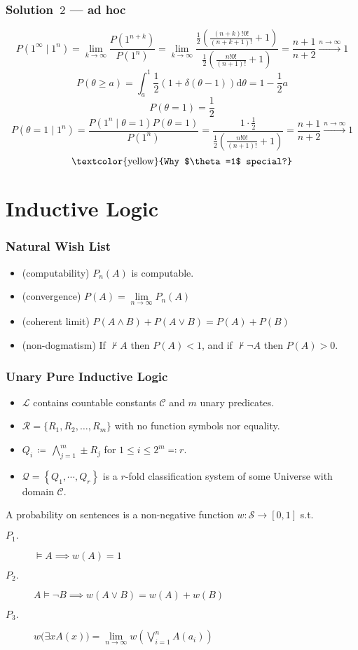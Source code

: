 \documentclass[UTF8,11pt,colorlinks,compress,openany]{beamer}%
\begin{document}
\begin{frame}\frametitle{Solution~$2$ --- ad hoc}
	\[P(1^\infty\mid 1^n)=\lim\limits_{k\to\infty}\dfrac{P(1^{n+k})}{P(1^n)}=\lim\limits_{k\to\infty}\dfrac{\frac{1}{2}\left(\frac{(n+k)!0!}{(n+k+1)!}+1\right)}{\frac{1}{2}\left(\frac{n!0!}{(n+1)!}+1\right)}=\dfrac{n+1}{n+2}\xrightarrow{n\to\infty} 1\]
	\[P(\theta\geq a)=\int_{a}^1\!\frac{1}{2}(1+\delta(\theta-1))\mathrm{d}\theta=1-\frac{1}{2}a\]
	\[P(\theta=1)=\frac{1}{2}\]
	\[P(\theta=1\mid 1^n)=\dfrac{P(1^n\mid \theta=1)P(\theta=1)}{P(1^n)}=\dfrac{1\cdot\frac{1}{2}}{\frac{1}{2}\left(\frac{n!0!}{(n+1)!}+1\right)}=\dfrac{n+1}{n+2}\xrightarrow{n\to\infty}1\]
	\[\text{\textcolor{yellow}{Why $\theta=1$ special?}}\]
\end{frame}

\section{Inductive Logic}

\begin{frame}\frametitle{Natural Wish List}
	\begin{itemize}
		\item (computability) $P_n(A)$ is computable.
		\item (convergence) $P(A)=\lim\limits_{n\to\infty}P_n(A)$
		\item (coherent limit) $P(A\wedge B)+P(A\vee B)=P(A)+P(B)$
		\item (non-dogmatism) If $\nvdash A$ then $P(A)<1$, and if $\nvdash\neg A$ then $P(A)>0$.
	\end{itemize}
\end{frame}

\begin{frame}\frametitle{Unary Pure Inductive Logic}
	\begin{itemize}
		\item $\mathscr{L}$ contains countable constants $\mathcal{C}$ and $m$ unary predicates.
		\item $\mathcal{R}=\{R_1,R_2,\ldots,R_m\}$ with no function symbols nor equality.
		\item $Q_i\,\coloneqq \,\bigwedge\limits_{j=1}^m\pm R_j$ for $1\leq i\leq 2^m\eqqcolon r$.
		\item $\mathcal{Q}=\left\{Q_1,\cdots,Q_r\right\}$ is a $r$-fold classification system of some Universe with domain $\mathcal{C}$.
	\end{itemize}
	\begin{definition}
		\noindent A probability on sentences is a non-negative function $w:\mathcal{S}\to[0,1]$ s.t.
		\begin{description}
			\item[$P_1.$] $\vDash A\implies w(A)=1$
			\item[$P_2.$] $A\vDash\neg B\implies w(A\vee B)=w(A)+w(B)$
			\item[$P_3.$] $w\big(\exists x A(x)\big)=\lim\limits_{n\to\infty} w\left(\bigvee\limits_{i=1}^n A(a_i)\right)$
		\end{description}
	\end{definition}
\end{frame}
\end{document}
